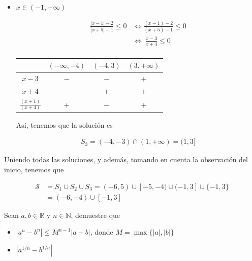 \documentclass[12pt]{book}
\begin{document}
\begin{itemize}
\begin{align*}
    S_2= [-5,-1) \cap \left[ (-\infty,-4) \cup (-1,+\infty)\right]
    &= [-5,4)
\end{align*}

\item $x \in (-1,+\infty)$

\begin{align*}
       \frac{|x-1|-2}{|x+5|-1} \leq 0  &\Longleftrightarrow    \frac{(x-1)-2}{(x+5)-1} \leq 0 \\ \ &\Longleftrightarrow \ \frac{x-3}{x+4} \leq 0 \\
    \end{align*}

\begin{center}
\begin{tabular}{|c|c|c|c|}
\hline
   & $(-\infty,-4) $  & $(-4,3)$ & $(3,+\infty)$ \\
   \hline
   $x-3$ & $-$ &$-$ &  $+$ \\ \hline
   $x+4$ & $-$ & $+$ & $+$ \\ \hline \hline
\rule{0pt}{0pt} $\displaystyle \frac{(x+1)}{(x+4)}$ & $+$ & $-$ & $+$ \\
   \hline
\end{tabular}
\end{center}
Así, tenemos que la solución es 

\begin{align*}
    S_3=(-4,-3) \cap (1,+\infty)=(1,3]
\end{align*}
\end{itemize}
Uniendo todas las soluciones, y además, tomando en cuenta la observación del inicio, tenemos que

\begin{align*}
    \mathcal{S}&=S_1 \cup S_2 \cup S_3 = (-6,5)\cup [-5,-4)\cup (-1,3] \cup \{-1,3\} \\
    &=(-6,-4) \cup [-1,3]
\end{align*}

\begin{prob}{}{}
    Sean $a,b \in \mathbb{R}$ y $n \in \mathbb{N}$, demuestre que 

    \begin{itemize}
        \item[\textbf{a)}] $|a^n-b^n|\leq M^{n-1}|a-b|$, donde $M=\max\{|a|,|b|\}$
        \item[\textbf{b)}] $|a^{1/n}-b^{1/n}|$
    \end{itemize}
\end{prob}
\end{document}
